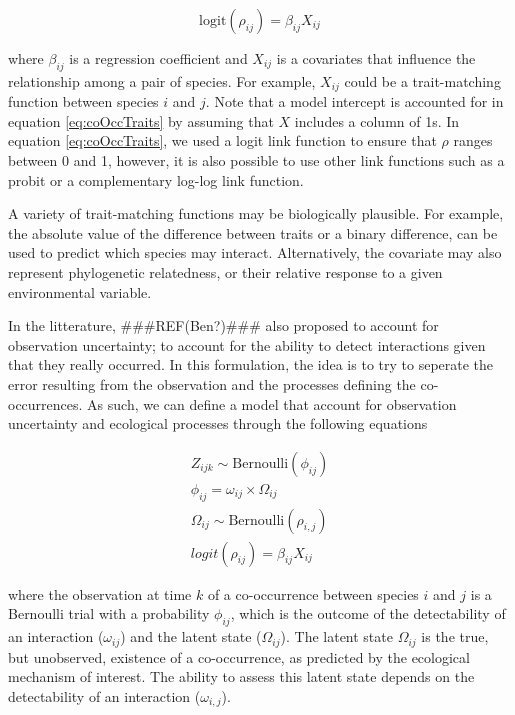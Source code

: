 \begin{equation}
  \label{eq:coOccTraits}
  \text{logit}(\rho_{ij}) = \beta_{ij}X_{ij}
\end{equation}

where $\beta_{ij}$ is a regression coefficient and $X_{ij}$ is a covariates that
influence the relationship among a pair of species. For example, $X_{ij}$ could
be a trait-matching function between species $i$ and $j$. Note that a model
intercept is accounted for in equation \ref{eq:coOccTraits} by assuming that $X$
includes a column of 1s. In equation \ref{eq:coOccTraits}, we used a logit link
function to ensure that $\rho$ ranges between 0 and 1, however, it is also
possible to use other link functions such as a probit or a complementary log-log
link function.

A variety of trait-matching functions may be biologically plausible. For
example, the absolute value of the difference between traits or a binary
difference, can be used to predict which species may interact. Alternatively,
the covariate may also represent phylogenetic relatedness, or their relative
response to a given environmental variable.

In the litterature, \#\#\#REF(Ben?)\#\#\# also proposed to account for
observation uncertainty; to account for the ability to detect interactions given
that they really occurred. In this formulation, the idea is to try to seperate
the error resulting from the observation and the processes defining the
co-occurrences. As such, we can define a model that account for observation uncertainty and ecological processes through the following equations

\begin{align}
  Z_{ijk} \sim \text{Bernoulli}(\phi_{ij})\\
  \phi_{ij} = \omega_{ij} \times \Omega_{ij}\\
  \Omega_{ij} \sim \text{Bernoulli}(\rho_{i,j})\\
  logit(\rho_{ij}) = \beta_{ij} X_{ij}
\end{align}

where the observation at time $k$ of a co-occurrence between species $i$ and $j$
is a Bernoulli trial with a probability $\phi_{ij}$, which is the outcome of the
detectability of an interaction ($\omega_{ij}$) and the latent state
($\Omega_{ij}$). The latent state $\Omega_{ij}$ is the true, but unobserved,
existence of a co-occurrence, as predicted by the ecological mechanism of
interest. The ability to assess this latent state depends on the detectability
of an interaction ($\omega_{i,j}$).

